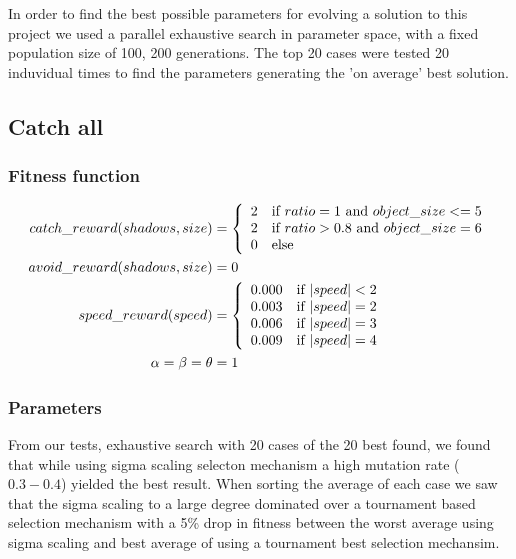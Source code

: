\documentclass[10pt]{article}
\begin{document}
In order to find the best possible parameters for evolving a solution to this project we used a parallel exhaustive search in parameter space, with a fixed population size of 100, 200 generations. The top 20 cases were tested 20 induvidual times to find the parameters generating the 'on average' best solution. 
	\subsection{Catch all}
		\subsubsection{Fitness function}\label{sec:fitness1}
			\begin{align}
				catch\_reward(shadows, size) &= \left\{ 
				\begin{array}{l l}
					2 &\text{if $ratio=1$ and $object\_size <= 5$} \\
					2 &\text{if $ratio>0.8$ and $object\_size = 6$}\\
					0 &\text{else}
       \end{array} \right.\nonumber\\
				avoid\_reward(shadows, size) &= 0\nonumber\\
				speed\_reward(speed) &= \left\{ 
				\begin{array}{l l}
					0.000 &\text{if $|speed| < 2$} \\
					0.003 &\text{if $|speed| = 2$} \\
					0.006 &\text{if $|speed| = 3$} \\
					0.009 &\text{if $|speed| = 4$} \\
       \end{array} \right.\nonumber\\
			 \alpha =\beta =\theta &= 1\nonumber
			\end{align}
		\subsubsection{Parameters}
			From our tests, exhaustive search with 20 cases of the 20 best found, we found that while using sigma scaling selecton mechanism a high mutation rate ($0.3-0.4$) yielded the best result. When sorting the average of each case we saw that the sigma scaling to a large degree dominated over a tournament based selection mechanism with a 5\% drop in fitness between the worst average using sigma scaling and best average of using a tournament best selection mechansim.
\end{document}
